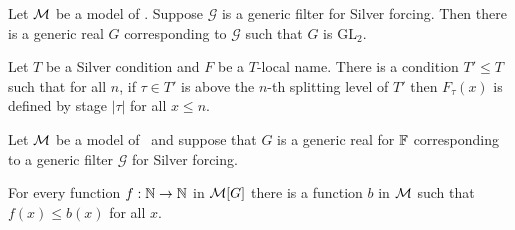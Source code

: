 \begin{cor}
Let $\mathcal{M}$ be a model of \ACAo.
Suppose $\mathcal{G}$ is a generic filter for Silver forcing.
Then there is a generic real $G$ corresponding to $\mathcal{G}$
such that $G$ is GL$_2$.
\end{cor}

\begin{prop}[\RCAo]\label{P:Sl:StrBnding}
Let $T$ be a Silver condition and $F$ be a $T$-local name.
There is a condition $T'\leq T$ such that for all $n$,
if $\tau\in T'$ is above the $n$-th splitting level of $T'$
then $F_\tau(x)$ is defined by stage $|\tau|$ for all $x\leq n$.
\end{prop}

\begin{cor}
Let $\mathcal{M}$ be a model of \RCAo\
and suppose that $G$ is a generic real for $\mathbb{F}$
corresponding to a generic filter $\mathcal{G}$ for Silver forcing.

For every function $f:\mathbb{N}\to\mathbb{N}$ in $\mathcal{M}[G]$
there is a function $b$ in $\mathcal{M}$ such that
$f(x)\leq b(x)$ for all $x$.
\end{cor}

